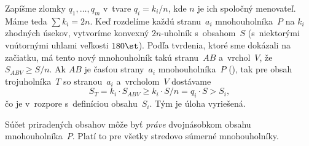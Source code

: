 {Zapíšme zlomky $q_1,\dots,q_m$ v~tvare $q_i=k_i/n$, kde $n$ je ich spoločný menovateľ. Máme teda $\sum k_i=2n$. Keď rozdelíme každú stranu~$a_i$ mnohouholníka~$P$ na $k_i$ zhodných úsekov, vytvoríme konvexný $2n$-uholník s~obsahom~$S$ (s~niektorými vnútornými uhlami veľkosti $180\st$). Podľa tvrdenia, ktoré sme dokázali na začiatku, má tento nový mnohouholník takú stranu~$AB$ a~vrchol~$V$, že $S_{ABV}\ge S/n$. Ak $AB$ je časťou strany~$a_i$ mnohouholníka~$P$ (\obr), tak pre obsah trojuholníka~$T$ so stranou~$a_i$ a~vrcholom~$V$ dostávame
$$
S_T=k_i\cdot S_{ABV}\ge k_i\cdot S/n=q_i\cdot S>S_i,
$$ 
čo je v~rozpore s~definíciou obsahu~$S_i$. Tým je úloha vyriešená.

\poznamka
Súčet priradených obsahov môže byť {\it práve\/} dvojnásobkom obsahu mnohouholníka~$P$. Platí to pre všetky stredovo súmerné mnohouholníky.
}

